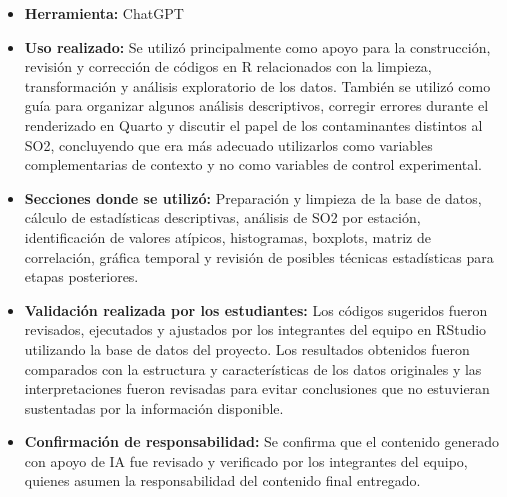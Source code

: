 \documentclass[
  letterpaper,
  DIV=11,
  numbers=noendperiod]{scrartcl}
\begin{document}
\begin{itemize}
\item
  \textbf{Herramienta:} ChatGPT
\item
  \textbf{Uso realizado:} Se utilizó principalmente como apoyo para la
  construcción, revisión y corrección de códigos en R relacionados con
  la limpieza, transformación y análisis exploratorio de los datos.
  También se utilizó como guía para organizar algunos análisis
  descriptivos, corregir errores durante el renderizado en Quarto y
  discutir el papel de los contaminantes distintos al SO2, concluyendo
  que era más adecuado utilizarlos como variables complementarias de
  contexto y no como variables de control experimental.
\item
  \textbf{Secciones donde se utilizó:} Preparación y limpieza de la base
  de datos, cálculo de estadísticas descriptivas, análisis de SO2 por
  estación, identificación de valores atípicos, histogramas, boxplots,
  matriz de correlación, gráfica temporal y revisión de posibles
  técnicas estadísticas para etapas posteriores.
\item
  \textbf{Validación realizada por los estudiantes:} Los códigos
  sugeridos fueron revisados, ejecutados y ajustados por los integrantes
  del equipo en RStudio utilizando la base de datos del proyecto. Los
  resultados obtenidos fueron comparados con la estructura y
  características de los datos originales y las interpretaciones fueron
  revisadas para evitar conclusiones que no estuvieran sustentadas por
  la información disponible.
\item
  \textbf{Confirmación de responsabilidad:} Se confirma que el contenido
  generado con apoyo de IA fue revisado y verificado por los integrantes
  del equipo, quienes asumen la responsabilidad del contenido final
  entregado.
\end{itemize}
\end{document}
